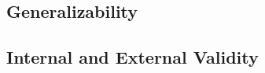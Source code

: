 




\subsection{Generalizability}








\subsection{Internal and External Validity}

























